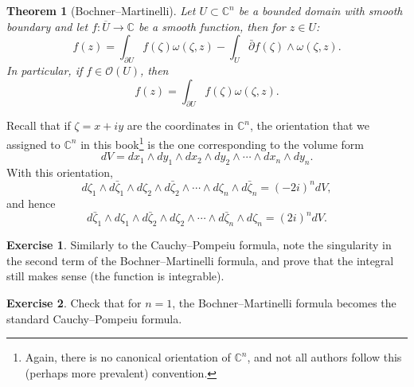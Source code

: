 \documentclass[12pt,openany]{book}
\newcommand{\C}{{\mathbb{C}}}
\newcommand{\sO}{{\mathscr{O}}}
\theoremstyle{plain}
\newtheorem{thm}{Theorem}[section]
\theoremstyle{remark}
\theoremstyle{definition}
\newenvironment{exbox}{%
    \def\FrameCommand{\vrule width 1pt \relax\hspace {10pt}}%
    \MakeFramed {\advance \hsize -\width \FrameRestore }%
}{%
    \endMakeFramed
}
\theoremstyle{exercise}
\newtheorem{exercise}{Exercise}[section]
\theoremstyle{example}
\begin{document}
\begin{thm}[Bochner--Martinelli] \label{thm:bochnermartinelli}
Let $U \subset \C^n$ be a bounded domain with smooth boundary and let
$f \colon \overline{U} \to \C$ be a smooth function,
then for $z \in U$:
\begin{equation*}
f(z) =
\int_{\partial U}
f(\zeta) \omega(\zeta,z)
-
\int_{U}
\bar{\partial} f(\zeta) \wedge \omega(\zeta,z) .
\end{equation*}
In particular, if $f \in \sO(U)$, then
\begin{equation*}
f(z) =
\int_{\partial U}
f(\zeta) \omega(\zeta,z) .
\end{equation*}
\end{thm}

Recall that if $\zeta = x+iy$ are the coordinates in $\C^n$, the orientation that we assigned to $\C^n$ in
this book\footnote{Again, there is
no canonical orientation of $\C^n$, and
not all authors follow this (perhaps more prevalent) convention.}
is the one corresponding to the volume form
%
\begin{equation*}
dV = dx_1 \wedge dy_1 \wedge dx_2 \wedge dy_2 \wedge \cdots \wedge dx_n \wedge dy_n .
\end{equation*}
With this orientation,
\begin{equation*}
d\zeta_1 \wedge d\bar{\zeta}_1 \wedge
d\zeta_2 \wedge d\bar{\zeta}_2 \wedge
\cdots \wedge
d\zeta_n \wedge d\bar{\zeta}_n = {(-2i)}^n dV ,
\end{equation*}
and hence
\begin{equation*}
d\bar{\zeta}_1 \wedge d\zeta_1 \wedge
d\bar{\zeta}_2 \wedge d\zeta_2 \wedge
\cdots \wedge
d\bar{\zeta}_n \wedge d\zeta_n = {(2i)}^n dV .
\end{equation*}

\begin{exbox}
\begin{exercise}
Similarly to the Cauchy--Pompeiu formula,
note the singularity in the second term of the Bochner--Martinelli formula,
and prove that the integral still makes
sense (the function is integrable).
\end{exercise}

\begin{exercise}
Check that for $n=1$, the Bochner--Martinelli formula
becomes the standard Cauchy--Pompeiu formula.
\end{exercise}
\end{exbox}
\end{document}
